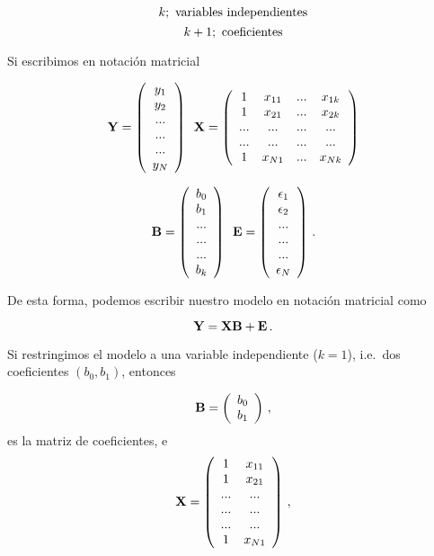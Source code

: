 \documentclass[
]{agujournal2019}
\begin{document}
\[k;\,\,{\rm variables\,\,independientes}\]
\[k+1;\,\,{\rm coeficientes}\]

\noindent Si escribimos en notación matricial

\[{\textbf Y}=\left(\begin{array}{c}
  y_1\\
  y_2\\
  ...\\
  ...\\
  ...\\
  y_N
      \end{array}\right)\,\,\,{\textbf X}=\left(\begin{array}{cccc}
  1 & x_{11} & ... & x_{1k}\\
  1 & x_{21} & ... & x_{2k}\\
  ... & ... & ... & ...\\
  ... & ... & ... & ...\\
  1 & x_{N1} & ... & x_{Nk}\\
      \end{array}\right)\]

\[{\textbf B}=\left(\begin{array}{c}
  b_0\\
  b_1\\
  ...\\
  ...\\
  ...\\
  b_k
      \end{array}\right)\,\,\,{\textbf E}=\left(\begin{array}{c}
  \epsilon_1\\
  \epsilon_2\\
  ...\\
  ...\\
  ...\\
  \epsilon_N
\end{array}\right)\,.\]

De esta forma, podemos escribir nuestro modelo en notación matricial
como

\[{\textbf Y}={\textbf X}{\textbf B} + {\textbf E}\,.\]

Si restringimos el modelo a una variable independiente (\(k=1\)),
i.e.~dos coeficientes \((b_0, b_1)\), entonces

\[{\textbf B}=\left(\begin{array}{c}
  b_0\\
  b_1\\
  \end{array}\right)\,,\] es la matriz de coeficientes, e
\[{\textbf X}=\left(\begin{array}{cc}
  1& x_{11}\\
  1& x_{21}\\
  ... & ...\\
  ... & ...\\
   ... & ...\\
  1& x_{N1}\end{array}\right)\,,
\]
\end{document}
